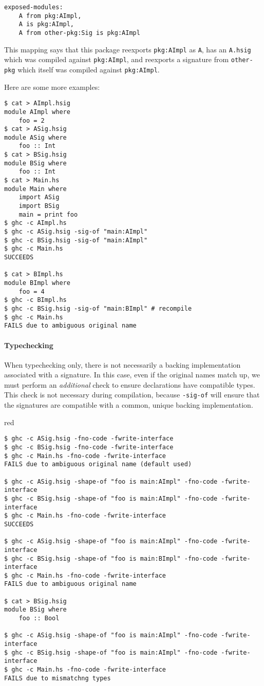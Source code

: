 \documentclass{article}
\newcommand{\Red}[1]{{\color{red} #1}}
\begin{document}
\begin{verbatim}
exposed-modules:
    A from pkg:AImpl,
    A is pkg:AImpl,
    A from other-pkg:Sig is pkg:AImpl
\end{verbatim}

This mapping says that this package reexports \texttt{pkg:AImpl} as
\texttt{A}, has an \texttt{A.hsig} which was compiled against
\texttt{pkg:AImpl}, and reexports a signature from \texttt{other-pkg}
which itself was compiled against \texttt{pkg:AImpl}.

Here are some more examples:

\begin{verbatim}
$ cat > AImpl.hsig
module AImpl where
    foo = 2
$ cat > ASig.hsig
module ASig where
    foo :: Int
$ cat > BSig.hsig
module BSig where
    foo :: Int
$ cat > Main.hs
module Main where
    import ASig
    import BSig
    main = print foo
$ ghc -c AImpl.hs
$ ghc -c ASig.hsig -sig-of "main:AImpl"
$ ghc -c BSig.hsig -sig-of "main:AImpl"
$ ghc -c Main.hs
SUCCEEDS

$ cat > BImpl.hs
module BImpl where
    foo = 4
$ ghc -c BImpl.hs
$ ghc -c BSig.hsig -sig-of "main:BImpl" # recompile
$ ghc -c Main.hs
FAILS due to ambiguous original name
\end{verbatim}

\paragraph{Typechecking}  \Red{When typechecking only, there is not
necessarily a backing implementation associated with a signature.  In
this case, even if the original names match up, we must perform an
\emph{additional} check to ensure declarations have compatible types.}
This check is not necessary during compilation, because \texttt{-sig-of}
will ensure that the signatures are compatible with a common, unique
backing implementation.

\begin{color}{red}
\begin{verbatim}
$ ghc -c ASig.hsig -fno-code -fwrite-interface
$ ghc -c BSig.hsig -fno-code -fwrite-interface
$ ghc -c Main.hs -fno-code -fwrite-interface
FAILS due to ambiguous original name (default used)

$ ghc -c ASig.hsig -shape-of "foo is main:AImpl" -fno-code -fwrite-interface
$ ghc -c BSig.hsig -shape-of "foo is main:AImpl" -fno-code -fwrite-interface
$ ghc -c Main.hs -fno-code -fwrite-interface
SUCCEEDS

$ ghc -c ASig.hsig -shape-of "foo is main:AImpl" -fno-code -fwrite-interface
$ ghc -c BSig.hsig -shape-of "foo is main:BImpl" -fno-code -fwrite-interface
$ ghc -c Main.hs -fno-code -fwrite-interface
FAILS due to ambiguous original name

$ cat > BSig.hsig
module BSig where
    foo :: Bool

$ ghc -c ASig.hsig -shape-of "foo is main:AImpl" -fno-code -fwrite-interface
$ ghc -c BSig.hsig -shape-of "foo is main:AImpl" -fno-code -fwrite-interface
$ ghc -c Main.hs -fno-code -fwrite-interface
FAILS due to mismatchng types
\end{verbatim}
\end{color}
\end{document}
